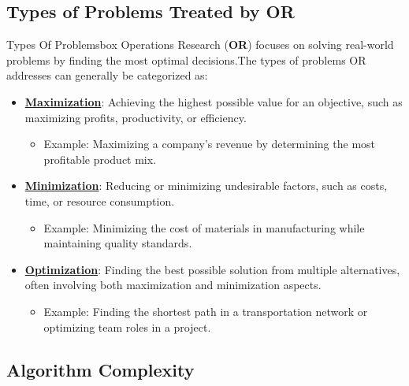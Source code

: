 \subsection{Types of Problems Treated by OR}

\begin{prettyBox}{Types Of Problems}{box}
Operations Research (\textbf{OR}) focuses on solving real-world problems by finding the most optimal decisions.The types of problems OR addresses can generally be categorized as:

\begin{itemize}
    \item \textbf{\underline{Maximization}}: Achieving the highest possible value for an objective, such as maximizing profits, productivity, or efficiency. 
        \begin{itemize}
            \item Example: Maximizing a company's revenue by determining the most profitable product mix.
        \end{itemize}
    
    \item \textbf{\underline{Minimization}}: Reducing or minimizing undesirable factors, such as costs, time, or resource consumption.
        \begin{itemize}
            \item Example: Minimizing the cost of materials in manufacturing while maintaining quality standards.
        \end{itemize}

    \item \textbf{\underline{Optimization}}: Finding the best possible solution from multiple alternatives, often involving both maximization and minimization aspects. 
        \begin{itemize}
            \item Example: Finding the shortest path in a transportation network or optimizing team roles in a project.
        \end{itemize}
\end{itemize}
\end{prettyBox}

\subsection{Algorithm Complexity}

